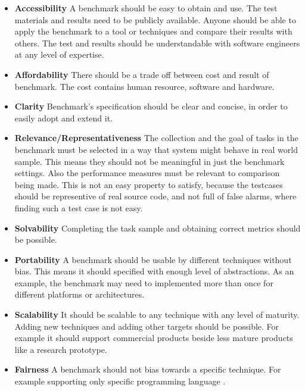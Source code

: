 \documentclass[authoryear,preprint]{sigplanconf}
\begin{document}
 \begin{itemize}
	\item \textbf{Accessibility} A benchmark should be easy to obtain and use. The test materials and results need to be publicly available. Anyone should be able to apply the benchmark to a tool or techniques and compare their results with others. The test and results should be understandable with software engineers at any level of expertise. 

	\item \textbf{Affordability} There should be a trade off between cost and result of benchmark. The cost contains human resource, software and hardware. 

	\item \textbf{Clarity} Benchmark's specification should be clear and concise, in order to easily adopt and extend it.
	
	\item \textbf{Relevance/Representativeness} The collection and the goal of tasks in the benchmark must be selected in a way that system might behave in real world sample. This means they should not be meaningful in just the benchmark settings. Also the performance measures must be relevant to comparison being made. This is not an easy property to satisfy, because the testcases should be representive of real source code, and not full of false alarms, where finding such a test case is not easy. 
	
	\item \textbf{Solvability} Completing the task sample and obtaining correct metrics should be possible. 
	
	\item \textbf{Portability} A benchmark should be usable by different techniques without bias. This means it should specified with enough level of abstractions. As an example, the benchmark may need to implemented more than once for different platforms or architectures. 
	
	\item \textbf{Scalability} It should be scalable to any technique with any level of maturity. Adding new techniques and adding other targets should be possible. For example it should support commercial products beside less mature products like a research prototype. 
	
	\item \textbf{Fairness} A benchmark should not bias towards a specific technique. For example supporting only specific programming language \cite{lu2005bugbench}.
\end{itemize}
\end{document}

